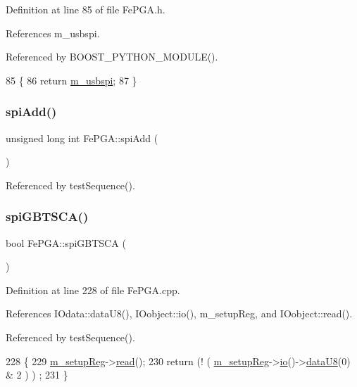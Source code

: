 Definition at line 85 of file Fe\+P\+G\+A.\+h.



References m\+\_\+usbspi.



Referenced by B\+O\+O\+S\+T\+\_\+\+P\+Y\+T\+H\+O\+N\+\_\+\+M\+O\+D\+U\+L\+E().


\begin{DoxyCode}
85                     \{
86     \textcolor{keywordflow}{return} \hyperlink{classFePGA_a922a56250b29c9842cdb8095cae8c976}{m\_usbspi};
87   \}
\end{DoxyCode}
\mbox{\label{classFePGA_a721de3fa12e207392cd6156027d2c776}} 
\subsubsection{\texorpdfstring{spi\+Add()}{spiAdd()}}
{\footnotesize\ttfamily unsigned long int Fe\+P\+G\+A\+::spi\+Add (\begin{DoxyParamCaption}{ }\end{DoxyParamCaption})}



Referenced by test\+Sequence().

\mbox{\label{classFePGA_ad305543bda4d68fe181cd7fa614b2fe1}} 
\subsubsection{\texorpdfstring{spi\+G\+B\+T\+S\+C\+A()}{spiGBTSCA()}}
{\footnotesize\ttfamily bool Fe\+P\+G\+A\+::spi\+G\+B\+T\+S\+CA (\begin{DoxyParamCaption}{ }\end{DoxyParamCaption})}



Definition at line 228 of file Fe\+P\+G\+A.\+cpp.



References I\+Odata\+::data\+U8(), I\+Oobject\+::io(), m\+\_\+setup\+Reg, and I\+Oobject\+::read().



Referenced by test\+Sequence().


\begin{DoxyCode}
228                       \{
229   \hyperlink{classFePGA_a0255fe229013986b4387c3a75ddf4e97}{m\_setupReg}->\hyperlink{classIOobject_aa07610c11963b1db6710e3c76ceea456}{read}();
230   \textcolor{keywordflow}{return} (! ( \hyperlink{classFePGA_a0255fe229013986b4387c3a75ddf4e97}{m\_setupReg}->\hyperlink{classIOobject_af04fb94137c3d86849f478ac5afab5d1}{io}()->\hyperlink{classIOdata_a75e9c318dbac3a39402179070943d4bc}{dataU8}(0) & 2 ) ) ;
231 \}
\end{DoxyCode}
\mbox{\label{classFePGA_a637b93fed75b576a54e723acb36cb6a3}} 
